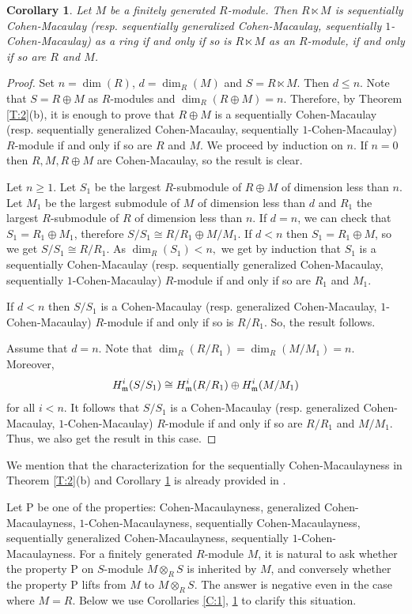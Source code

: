 \documentclass[a4papersize]{article}
\newtheorem{corollary}[theorem]{Corollary}
\begin{document}
{\begin{corollary} \label{C:2} Let $M$ be a finitely generated $R$-module. Then $R\ltimes M$ is sequentially  Cohen-Macaulay (resp. sequentially  generalized Cohen-Macaulay, sequentially  $1$-Cohen-Macaulay) as a ring  if and only if  so is $R\ltimes M$ as an $R$-module, if and only if so are $R$ and $M$.  
\end{corollary}

\begin{proof}  	Set $n=\dim (R)$, $d=\dim_R(M)$ and $S=R\ltimes M$. Then $d\leq n.$ Note that $S=R\oplus M$ as $R$-modules and $\dim_R(R\oplus M)=n$. Therefore, by Theorem \ref{T:2}(b), it is enough to prove that $R\oplus M$ is a sequentially  Cohen-Macaulay (resp. sequentially  generalized Cohen-Macaulay, sequentially  $1$-Cohen-Macaulay)  $R$-module if and only if so are $R$ and $M$. We  proceed by induction on $n$. If  $n=0$ then $R, M, R\oplus M$ are Cohen-Macaulay, so the result  is clear. 
		
Let $n\geq 1.$ Let $S_1$ be the largest $R$-submodule of $R\oplus M$ of dimension less than $n$.  Let $M_1$ be the largest submodule of $M$  of dimension less than $d$ and  $R_1$ the largest $R$-submodule of $R$  of dimension less than $n$.  If $d=n$, we can check that $S_1=R_1\oplus M_1$, therefore $S/S_1\cong R/R_1\oplus M/M_1$. If $d<n$ then $S_1=R_1\oplus M$, so we get   $S/S_1\cong R/R_1$. As $\dim_R(S_1)<n,$ we get by induction that $S_1$ is a sequentially  Cohen-Macaulay (resp. sequentially  generalized Cohen-Macaulay, sequentially  $1$-Cohen-Macaulay) $R$-module if and only if so are $R_1$ and $M_1$. 
		
If $d<n$ then $S/S_1$ is a Cohen-Macaulay (resp. generalized Cohen-Macaulay, $1$-Cohen-Macaulay) $R$-module if and only if so is  $R/R_1$.  So, the result follows.	
		
Assume that $d=n$. Note that $\dim_R(R/R_1)=\dim_R(M/M_1)=n$. Moreover, $$H_{\frak m}^i(S/S_1)\cong H^i_{\frak m}(R/R_1)\oplus H^i_{\frak m}(M/M_1)$$ for all $i<n$. It follows that $S/S_1$ is a Cohen-Macaulay (resp. generalized Cohen-Macaulay, $1$-Cohen-Macaulay) $R$-module if and only if so are $R/R_1$ and $M/M_1$. Thus, we also get the result in this case. 		
\end{proof}

We mention that  the characterization for the sequentially Cohen-Macaulayness in Theorem \ref{T:2}(b) and Corollary \ref{C:2} is already provided in \cite{TPDA}. 
		
Let P be one of the properties: Cohen-Macaulayness, generalized Cohen-Macaulayness, $1$-Cohen-Macaulayness,  sequentially  Cohen-Macaulayness, sequentially  generalized Cohen-Macaulayness, sequentially  $1$-Cohen-Macaulayness. For a finitely generated $R$-module $M$, it is natural to ask whether the property P on $S$-module $M\otimes_RS$ is inherited by $M$, and conversely whether the property P lifts from $M$ to $M\otimes_RS$. The answer is negative even in the case where $M=R.$ Below we use  Corollaries \ref{C:1}, \ref{C:2} to clarify this situation.
		
}
\end{document}
